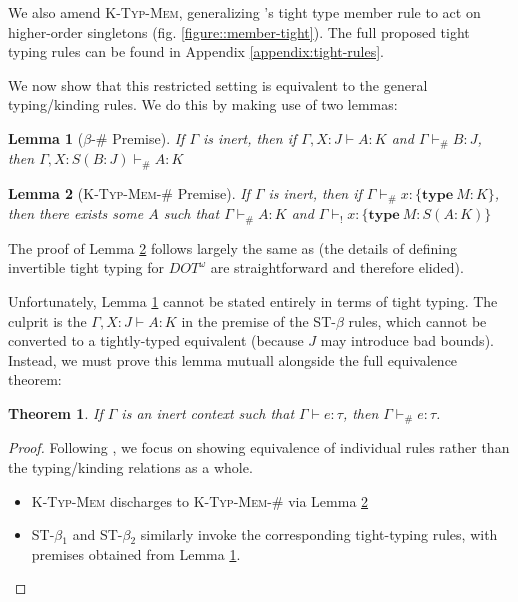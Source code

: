 \documentclass[a4paper, 10pt]{article}
\newcommand{\DOTw}{\ensuremath{DOT^\omega}}
\newcommand{\objtyp}[3]{\{ \textbf{#1}\ #2 : #3 \}}
\newtheorem{theorem}{Theorem}
\newtheorem{lemma}{Lemma}
\begin{document}
We also amend \textsc{K-Typ-Mem}, generalizing \citet{amin2016}'s tight
type member rule to act on higher-order singletons (fig.
\ref{figure::member-tight}). The full proposed tight typing rules can be found
in Appendix \ref{appendix:tight-rules}.

We now show that this restricted setting is equivalent to the general
typing/kinding rules. We do this by making use of two lemmas:

\begin{lemma}[$\beta$-\# Premise]\label{lemma:beta-premise}
  If $\Gamma$ is inert, then if $\Gamma, X : J \vdash A : K$ and
  $\Gamma \vdash_\# B : J$, then $\Gamma, X : S(B:J) \vdash_\# A : K$
\end{lemma}

\begin{lemma}[\textsc{K-Typ-Mem}-\# Premise]\label{lemma:k-typ-mem-premise}
  If $\Gamma$ is inert, then if $\Gamma \vdash_\# x : \objtyp{type}{M}{K}$,
  then there exists some  $A$ such that $\Gamma \vdash_\# A: K$ and $\Gamma
  \vdash_! x : \objtyp{type}{M}{S(A:K)}$
\end{lemma}

The proof of Lemma \ref{lemma:k-typ-mem-premise} follows largely the same as
\citet{rapoport2017} (the details of defining invertible tight typing for
$\DOTw$ are straightforward and therefore elided).

Unfortunately, Lemma \ref{lemma:beta-premise} cannot be stated entirely in
terms of tight typing. The culprit is the $\Gamma, X:J \vdash A:K$ in the
premise of the \textsc{ST-$\beta$} rules, which cannot be converted to a
tightly-typed equivalent (because $J$ may introduce bad bounds). Instead,
we must prove this lemma mutuall alongside the full equivalence theorem:

\begin{theorem}\label{thm:general-tight}
  If $\Gamma$ is an inert context such that $\Gamma \vdash e : \tau$, then
  $\Gamma \vdash_\# e : \tau$.
\end{theorem}
\begin{proof}
  Following \citet{rapoport2017}, we focus on showing equivalence of individual
  rules rather than the typing/kinding relations as a whole.

  \begin{itemize}
    \item \textsc{K-Typ-Mem} discharges to \textsc{K-Typ-Mem-\#} via Lemma
      \ref{lemma:k-typ-mem-premise}
    \item \textsc{ST-$\beta_1$} and \textsc{ST-$\beta_2$} similarly invoke the
      corresponding tight-typing rules, with premises obtained from Lemma
      \ref{lemma:beta-premise}.
  \end{itemize}
\end{proof}
\end{document}
